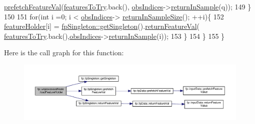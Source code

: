 \begin{DoxyCode}
      \hyperlink{classfp_1_1fpSingleton_ab789c4e4bfb3248711a5857015008f8d}{prefetchFeatureVal}(\hyperlink{classfp_1_1unprocessedNode_ab625569c5339dfbe93b487765f530313}{featuresToTry}.back(),
      \hyperlink{classfp_1_1unprocessedNode_aba9f03124658f62906fa8ded53cef535}{obsIndices}->\hyperlink{classfp_1_1stratifiedInNodeClassIndices_a2d7e802fb97db0367bb8e8f31d393afd}{returnInSample}(q));
149                         \}
150                         
151                         \textcolor{keywordflow}{for}(\textcolor{keywordtype}{int} i =0; i < \hyperlink{classfp_1_1unprocessedNode_aba9f03124658f62906fa8ded53cef535}{obsIndices}->
      \hyperlink{classfp_1_1stratifiedInNodeClassIndices_a596235ffec7250fabd2818d395b39c66}{returnInSampleSize}(); ++i)\{
152                             \hyperlink{classfp_1_1unprocessedNode_ac2a435f6f38c5c0d2b4ba4b721fd5eaa}{featureHolder}[i] = 
      \hyperlink{classfp_1_1fpSingleton_a8bdae77b68521003e3fc630edec2e240}{fpSingleton::getSingleton}().\hyperlink{classfp_1_1fpSingleton_aacc2eb894a219e2fe234743b51fa1a76}{returnFeatureVal}(
      \hyperlink{classfp_1_1unprocessedNode_ab625569c5339dfbe93b487765f530313}{featuresToTry}.back(),\hyperlink{classfp_1_1unprocessedNode_aba9f03124658f62906fa8ded53cef535}{obsIndices}->\hyperlink{classfp_1_1stratifiedInNodeClassIndices_a2d7e802fb97db0367bb8e8f31d393afd}{returnInSample}(i));
153                         \}
154                     \}
155                 \}
\end{DoxyCode}
Here is the call graph for this function\+:
\nopagebreak
\begin{figure}[H]
\begin{center}
\leavevmode
\includegraphics[width=350pt]{classfp_1_1unprocessedNode_a8cedeb8c4c88345ff97f9afb89b3ccd0_cgraph}
\end{center}
\end{figure}
\mbox{\label{classfp_1_1unprocessedNode_a8cedeb8c4c88345ff97f9afb89b3ccd0}} 
